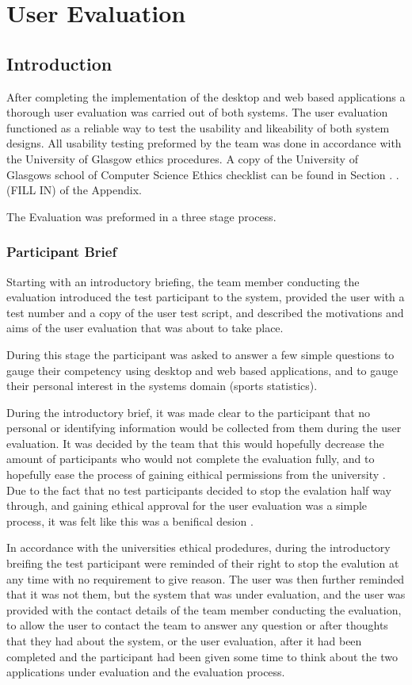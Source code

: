 \section{User Evaluation}

\subsection{Introduction}

After completing the implementation of the desktop and web based applications a thorough user evaluation was carried out of both systems. The user evaluation functioned as a reliable way to test the usability and likeability of both system designs. All usability testing preformed by the team was done in accordance with the University of Glasgow ethics procedures. A copy of the University of Glasgows school of Computer Science Ethics checklist can be found in Section . . (FILL IN) of the Appendix. 

The Evaluation was preformed in a three stage process. 


\subsubsection{ Participant Brief }

Starting with an introductory briefing, the team member conducting the evaluation introduced the test participant to the system, provided the user with a test number and a copy of the user test script, and described the motivations and aims of the user evaluation that was about to take place.  

During this stage the participant was asked to answer a few simple questions to gauge their competency using desktop and web based applications, and to gauge their personal interest in the systems domain (sports statistics).

 During the introductory brief, it was made clear to the participant that no personal or identifying information would be collected from them during the user evaluation.  It was decided by the team that this would hopefully decrease the amount of participants who would not complete the evaluation fully, and to hopefully ease the process of gaining eithical permissions from the university . Due to the fact that no test participants decided to stop the evalation half way through, and gaining ethical approval for the user evaluation was a simple process, it was felt like this was a benifical desion . 

In accordance with the universities ethical prodedures, during the introductory breifing the test participant were reminded of their right to stop the evalution at any time with no requirement to give reason. The user was then further reminded that it was not them, but the system that was under evaluation, and the user was provided with the contact details of the team member conducting the evaluation, to allow the user to contact the team to answer any question or after thoughts that they had about the system, or the user evaluation, after it had been completed and the participant had been given some time to think about the two applications under evaluation and the evaluation process.

